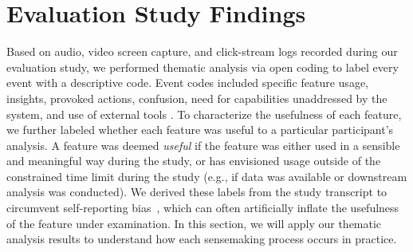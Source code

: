  \section{Evaluation Study Findings\label{sec:eval_findings}}
 Based on audio, video screen capture,
 and click-stream logs recorded
 during our  evaluation study,
 we performed thematic analysis via open coding to label every event with a descriptive code. Event codes included specific feature usage,
 insights,
 provoked actions, confusion,
 need for capabilities unaddressed
 by the system, and use of external tools . To characterize the usefulness
 of each feature, we further labeled whether each
 feature was useful to a particular participant's analysis.
 A feature was deemed \textit{useful}
 if the feature was either used in a sensible
 and meaningful way  during the study,
 or has envisioned usage outside of the constrained
 time limit during the study
 (e.g., if data was available or downstream analysis was conducted).
 We derived these labels from the study transcript
 to circumvent self-reporting bias~\cite{Williams2017},
 which can often artificially inflate
 the usefulness of the feature under examination.
 In this section, we will apply our thematic analysis results to understand how each sensemaking process occurs in practice.%
